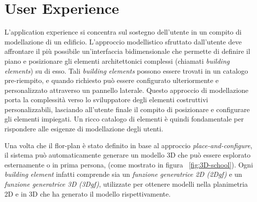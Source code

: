 \section{User Experience}
\label{sec:chapter_2_section_5}


L'application experience si concentra sul sostegno dell'utente in un compito di modellazione di un edificio.
L'approccio modellistico sfruttato dall'utente deve affrontare il pi\`u possibile un'interfaccia bidimensionale che permette
di definire il piano e posizionare gli elementi architettonici complessi (chiamati \emph{building elements}) su di esso.
Tali \emph{building elements} possono essere trovati in un catalogo pre-riempito, e quando richiesto pu\`o essere
configurato ulteriormente e personalizzato attraverso un pannello laterale. Questo approccio
di modellazione porta la complessit\`a verso lo sviluppatore degli elementi costruttivi personalizzabili,
lasciando all'utente finale il compito di posizionare e configurare gli elementi impiegati.
Un ricco catalogo di elementi \`e quindi fondamentale per rispondere alle esigenze di modellazione degli utenti.


Una volta che il flor-plan \`e stato definito in base al approccio \emph{place-and-configure}, il sistema pu\`o automaticamente
generare un modello 3D che pu\`o essere esplorato esternamente o in prima persona, (come mostrato in figura ~\ref{fig:3D-school}).
Ogni \emph{building element} infatti comprende sia un \emph{funzione generatrice 2D (2Dgf)} e un
\emph{funzione generatrice 3D (3Dgf)}, utilizzate per ottenere modelli nella planimetria 2D e in 3D che ha generato il modello
rispettivamente.

